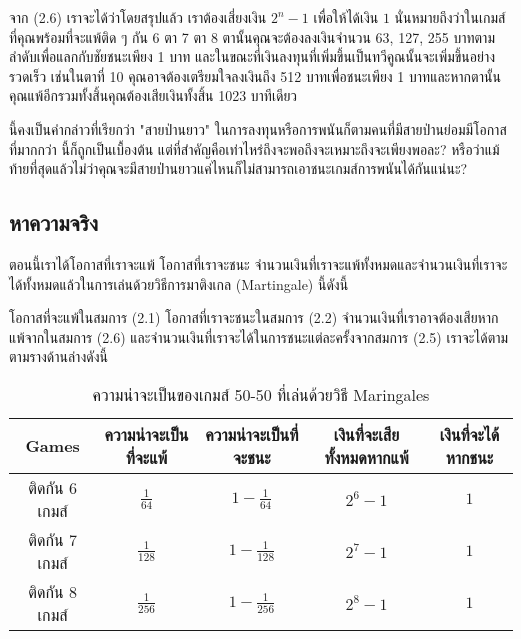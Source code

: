 \documentclass{article}
\begin{document}
จาก (2.6) เราจะได้ว่าโดยสรุปแล้ว เราต้องเสี่ยงเงิน $2^n-1$ เพื่อให้ได้เงิน $1$ นั่นหมายถึงว่าในเกมส์ที่คุณพร้อมที่จะแพ้ติด ๆ กัน 6 ตา 7 ตา 8 ตานั้นคุณจะต้องลงเงินจำนวน 63, 127, 255 บาทตามลำดับเพื่อแลกกับชัยชนะเพียง 1 บาท และในขณะที่เงินลงทุนที่เพิ่มขึ้นเป็นทวีคูณนั้นจะเพิ่มขึ้นอย่างรวดเร็ว เช่นในตาที่ 10 คุณอาจต้องเตรียมใจลงเงินถึง 512 บาทเพื่อชนะเพียง 1 บาทและหากตานั้นคุณแพ้อีกรวมทั้งสิ้นคุณต้องเสียเงินทั้งสิ้น 1023 บาทีเดียว
\begin{center}
\end{center}
นี้คงเป็นคำกล่าวที่เรียกว่า "สายป่านยาว" ในการลงทุนหรือการพนันก็ตามคนที่มีสายป่านย่อมมีโอกาสที่มากกว่า นี้ก็ถูกเป็นเบื้องต้น แต่ที่สำคัญคือเท่าไหร่ถึงจะพอถึงจะเหมาะถึงจะเพียงพอละ? หรือว่าแม้ท้ายที่สุดแล้วไม่ว่าคุณจะมีสายป่านยาวแค่ไหนก็ไม่สามารถเอาชนะเกมส์การพนันได้กันแน่นะ?

\subsection{หาความจริง}

ตอนนี้เราได้โอกาสที่เราจะแพ้ โอกาสที่เราจะชนะ จำนวนเงินที่เราจะแพ้ทั้งหมดและจำนวนเงินที่เราจะได้ทั้งหมดแล้วในการเล่นด้วยวิธีการมาติงเกล (Martingale) นี้ดังนี้

โอกาสที่จะแพ้ในสมการ (2.1) โอกาสที่เราจะชนะในสมการ (2.2) จำนวนเงินที่เราอาจต้องเสียหากแพ้จากในสมการ (2.6) และจำนวนเงินที่เราจะได้ในการชนะแต่ละครั้งจากสมการ (2.5) เราจะได้ตามตามรางด้านล่างดังนี้

\begin{table}[hbt]
\centering
\begin{tabular}{|c|c|c|c|c|}
\hline
Games & ความน่าจะเป็นที่จะแพ้ & ความน่าจะเป็นที่จะชนะ & เงินที่จะเสียทั้งหมดหากแพ้ & เงินที่จะได้หากชนะ \\
\hline
ติดกัน 6 เกมส์ & $\frac{1}{64}$ & $1-\frac{1}{64}$ & $2^6-1$ & $1$ \\
ติดกัน 7 เกมส์ & $\frac{1}{128}$ & $1-\frac{1}{128}$ & $2^7-1$ & $1$ \\
ติดกัน 8 เกมส์ & $\frac{1}{256}$ & $1-\frac{1}{256}$ & $2^8-1$ & $1$ \\
\hline
\end{tabular}
\caption{ความน่าจะเป็นของเกมส์ 50-50 ที่เล่นด้วยวิธี Maringales}
\end{table} 
\end{document}
